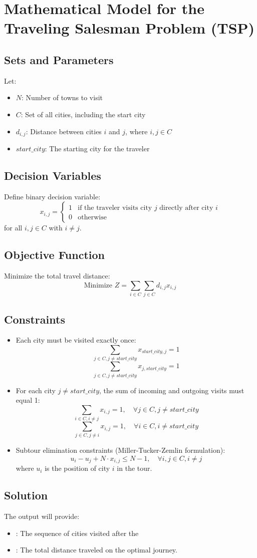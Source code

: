 \documentclass{article}
\begin{document}
\section*{Mathematical Model for the Traveling Salesman Problem (TSP)}

\subsection*{Sets and Parameters}
Let:
\begin{itemize}
    \item $N$: Number of towns to visit
    \item $C$: Set of all cities, including the start city
    \item $d_{i,j}$: Distance between cities $i$ and $j$, where $i, j \in C$
    \item $start\_city$: The starting city for the traveler
\end{itemize}

\subsection*{Decision Variables}
Define binary decision variable:
\[
x_{i,j} = 
\begin{cases} 
1 & \text{if the traveler visits city } j \text{ directly after city } i \\
0 & \text{otherwise}
\end{cases}
\]
for all \(i, j \in C\) with \(i \neq j\).

\subsection*{Objective Function}
Minimize the total travel distance:
\[
\text{Minimize } Z = \sum_{i \in C} \sum_{j \in C} d_{i,j} x_{i,j}
\]

\subsection*{Constraints}
\begin{itemize}
    \item Each city must be visited exactly once:
    \[
    \sum_{j \in C, j \neq start\_city} x_{start\_city,j} = 1
    \]
    \[
    \sum_{j \in C, j \neq start\_city} x_{j,start\_city} = 1
    \]
    \item For each city $j \neq start\_city$, the sum of incoming and outgoing visits must equal 1:
    \[
    \sum_{i \in C, i \neq j} x_{i,j} = 1, \quad \forall j \in C, j \neq start\_city
    \]
    \[
    \sum_{j \in C, j \neq i} x_{i,j} = 1, \quad \forall i \in C, i \neq start\_city
    \]
    \item Subtour elimination constraints (Miller-Tucker-Zemlin formulation):
    \[
    u_i - u_j + N \cdot x_{i,j} \leq N - 1, \quad \forall i,j \in C, i \neq j
    \]
    where \(u_i\) is the position of city \(i\) in the tour.
\end{itemize}

\subsection*{Solution}
The output will provide:
\begin{itemize}
    \item {}: The sequence of cities visited after the 
    \item {}: The total distance traveled on the optimal journey.
\end{itemize}
\end{document}
